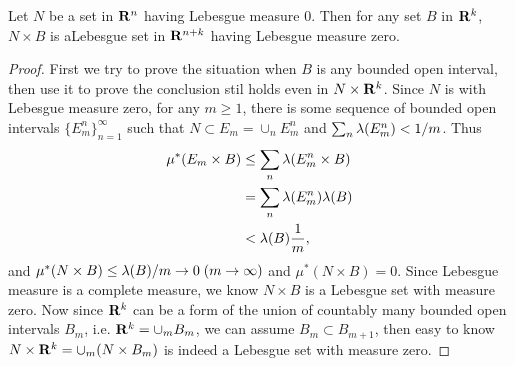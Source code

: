 \begin{pro}%
	Let $N$ be a set in $\mathbf{R}^n$ having Lebesgue measure $0$. Then for any set $B$ in $\mathbf{R}^k$, $N\times B$ is aLebesgue set in $\mathbf{R}^{n+k}$ having Lebesgue measure zero.
\end{pro}
\begin{proof}
	First we try to prove the situation when $B$ is any bounded open interval, then use it to prove the conclusion stil holds even in $N\times\mathbf{R}^k$. Since $N$ is with Lebesgue measure zero, for any $m\geq 1$, there is some sequence of bounded open intervals $\{E_m^n\}_{n=1}^{\infty}$ such that $N\subset E_m=\cup_n E_m^n$ and $\sum_n \lambda(E_m^n)<1/m$. Thus
	\begin{align*}
	\mu^*(E_m\times B)&\leq \sum_n \lambda(E_m^n\times B)\\
	&=\sum_n \lambda(E_m^n)\lambda(B)\\
	&<\lambda(B)\frac{1}{m},
	\end{align*}
	and $\mu^*(N\times B)\leq \lambda(B)/m\to 0\;(m\to\infty)$ and $\mu^*(N\times B)=0$. Since Lebesgue measure is a complete measure, we know $N\times B$ is a Lebesgue set with measure zero. Now since $\mathbf{R}^k$ can be a form of the union of countably many bounded open intervals $B_m$, i.e. $\mathbf{R}^k=\cup_m B_m$, we can assume $B_m\subset B_{m+1}$, then easy to know $N\times \mathbf{R}^k=\cup_m (N\times B_m)$ is indeed a Lebesgue set with measure zero.
\end{proof}


